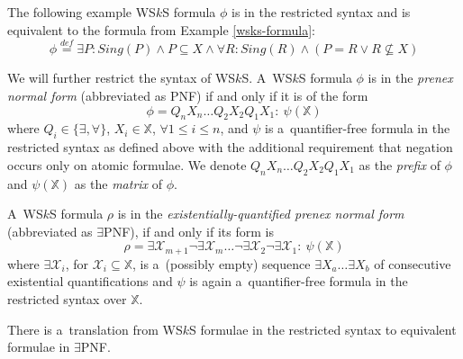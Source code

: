 	  \noindent\hrulefill
  \begin{example}
  The following example WS$k$S formula $\phi$ is in the restricted syntax and is
  equivalent to the formula from Example \ref{wsks-formula}:
  \begin{equation}
   \phi \overset{\mathit{def}}{=} \exists P: \mathit{Sing}(P) \wedge P \subseteq
   X \wedge \forall R: \mathit{Sing}(R) \wedge (P = R \vee R \not\subseteq X)
  \end{equation}
   \hrulefill
  \end{example}\label{wsks-formula-restricted}
	
We will further restrict the syntax of WS$k$S. A~WS$k$S formula $\phi$ is in the
\emph{prenex normal form} (abbreviated as PNF) if and only if it is of the form
\begin{equation}
\phi = Q_nX_n\ldots Q_2X_2Q_1X_1:\ \psi(\mathds{X})
\end{equation} where 
$Q_i \in \{\exists,\forall\}$, $X_i \in \mathds{X}$, $\forall 1 \leq i \leq n$,
and $\psi$ is a~quantifier-free formula in the restricted syntax as defined
above with the additional requirement that negation occurs only on atomic
formulae.
We denote $Q_nX_n\ldots Q_2X_2Q_1X_1$ as the \emph{prefix} of $\phi$ and $\psi(\mathds{X})$ as the \emph{matrix} of $\phi$.
	
A~WS$k$S formula $\rho$ is in the \emph{existentially-quantified prenex normal
form} (abbreviated as $\exists$PNF), if and only if its form is 
\begin{equation}\rho =
\exists \mathcal{X}_{m+1}\neg\exists \mathcal{X}_m\ldots\neg\exists
\mathcal{X}_2\neg\exists \mathcal{X}_1:\ \psi(\mathds{X})
\end{equation} where
$\exists\mathcal{X}_i$, for $\mathcal{X}_i \subseteq \mathds{X}$, is a~(possibly
empty) sequence $\exists X_a\ldots\exists X_b$ of consecutive existential
quantifications and $\psi$ is again a~quantifier-free formula in the restricted
syntax over $\mathds{X}$.
\newpage	
	\begin{prop}
There is a~translation from WS$k$S formulae in the restricted syntax to
equivalent formulae in $\exists$PNF.
	\end{prop}
	

